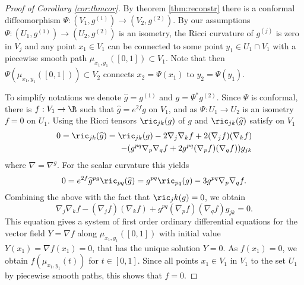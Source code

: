 \begin{proof}[Proof of Corollary \ref{cor:thmcor}]
By theorem \ref{thm:reconstr} there is a conformal diffeomorphism $\Psi:(V_1,g^{(1)})\to(V_2,g^{(2)})$. By our assumptions $\Psi:(U_1,g^{(1)})\to(U_2,g^{(2)})$ is an isometry, the Ricci curvature of $g^{(j)}$ is zero in $V_j$ and any point $x_1\in V_1$ can be connected to some point $y_1\in U_1\cap V_1$ with a piecewise smooth path $\mu_{x_1,y_1}([0,1])\subset V_1$. Note that then $\Psi(\mu_{x_1,y_1}([0,1]))\subset V_2$ connects $x_2=\Psi(x_1)$ to $y_2=\Psi(y_1)$.

To simplify notations we denote $\widehat{g}=g^{(1)}$ and $g=\Psi^*g^{(2)}$. Since $\Psi$ is conformal, there is $f:V_1\to \R$ such that $\widehat{g}=e^{2f}g$ on $V_1$, and as $\Psi:U_1\to U_2$ is an isometry $f=0$ on $U_1$. Using \cite[formula (2.73)]{Halburd_2008} the Ricci tensors $\ric_{jk}(g)$ of $g$ and $\ric_{jk}(\widehat{g})$ satisfy on $V_1$
\begin{align*}
    0 = \ric_{jk}(\widehat{g}) = \ric_{jk}(g) - 2 \nabla_j\nabla_k f + 2 (\nabla_j f)(\nabla_k f) \\- (g^{pq}\nabla_p\nabla_q f+ 2g^{pq}(\nabla_pf)(\nabla_q f))g_{jk}
\end{align*}
where $\nabla = \nabla^g$. For the scalar curvature this yields
\[
    0 = e^{2f}\widehat{g}^{pg}\ric_{pq}(\widehat{g}) = g^{pq}\ric_{pq}(g) -3g^{pq}\nabla_p\nabla_qf.
\]
Combining the above with the fact that $\ric_jk(g)=0$, we obtain
\[
\nabla_j\nabla_kf-(\nabla_jf)(\nabla_kf)+g^{pq}(\nabla_pf)(\nabla_qf)g_{jk}=0.
\]
This equation gives a system of first order ordinary differential equations for the vector field $Y=\nabla f$ along $\mu_{x_1,y_1}([0,1])$ with initial value $Y(x_1)=\nabla f(x_1) = 0$, that has the unique solution $Y=0$. As $f(x_1)=0$, we obtain $f(\mu_{x_1,y_1}(t))$ for $t\in [0,1]$. Since all points $x_1\in V_1$ in $V_1$ to the set $U_1$ by piecewise smooth paths, this shows that $f=0$.
\end{proof}